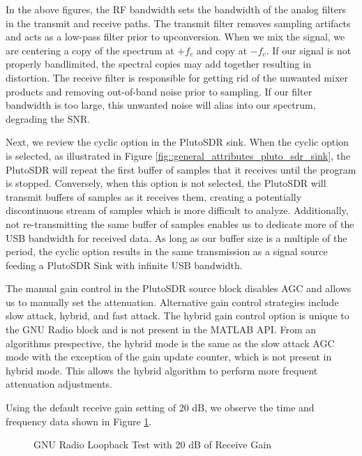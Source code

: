 \documentclass{article}
\begin{document}
In the above figures, the RF bandwidth sets the bandwidth of the analog filters in the transmit and receive paths. The transmit filter removes sampling artifacts and acts as a low-pass filter prior to upconversion. When we mix the signal, we are centering a copy of the spectrum at $+f_c$ and copy at $-f_c$. If our signal is not properly bandlimited, the spectral copies may add together resulting in distortion. The receive filter is responsible for getting rid of the unwanted mixer products and removing out-of-band noise prior to sampling. If our filter bandwidth is too large, this unwanted noise will alias into our spectrum, degrading the SNR. 

Next, we review the cyclic option in the PlutoSDR sink. When the cyclic option is selected, as illustrated in Figure \ref{fig::general_attributes_pluto_sdr_sink}, the PlutoSDR will repeat the first buffer of samples that it receives until the program is stopped. Conversely, when this option is not selected, the PlutoSDR will transmit buffers of samples as it receives them, creating a potentially discontinuous stream of samples which is more difficult to analyze. Additionally, not re-transmitting the same buffer of samples enables us to dedicate more of the USB bandwidth for received data. As long as our buffer size is a multiple of the period, the cyclic option results in the same transmission as a signal source feeding a PlutoSDR Sink with infinite USB bandwidth.

The manual gain control in the PlutoSDR source block disables AGC and allows us to manually set the attenuation. Alternative gain control strategies include slow attack, hybrid, and fast attack. The hybrid gain control option is unique to the GNU Radio block and is not present in the MATLAB API. From an algorithms prespective, the hybrid mode is the same as the slow attack AGC mode with the exception of the gain update counter, which is not present in hybrid mode. This allows the hybrid algorithm to perform more frequent attenuation adjustments.

Using the default receive gain setting of 20 dB, we observe the time and frequency data shown in Figure \ref{fig::gnu_radio_loopback_baseline}.

\begin{figure}[H]
	\centerline{}
	\caption{GNU Radio Loopback Test with 20 dB of Receive Gain}
	\label{fig::gnu_radio_loopback_baseline}
\end{figure}
\end{document}
